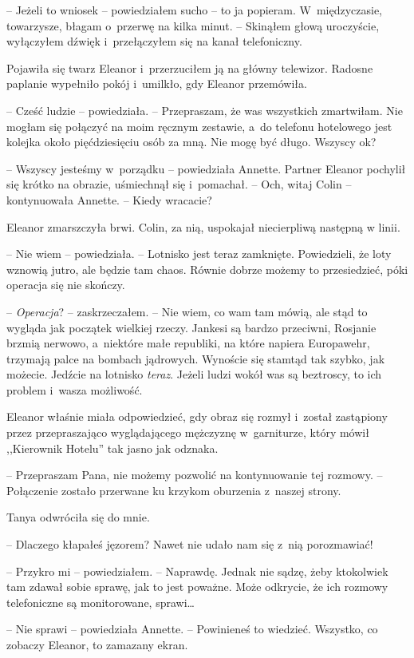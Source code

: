 \documentclass[oneside,polish,11pt,sfheadings]{mwbk}
\begin{document}
-- Jeżeli to wniosek -- powiedziałem sucho -- to ja popieram. W~międzyczasie, towarzysze, błagam o~przerwę na kilka minut. -- Skinąłem
głową uroczyście, wyłączyłem dźwięk i~przełączyłem się na kanał
telefoniczny.

Pojawiła się twarz Eleanor i~przerzuciłem ją na główny telewizor.
Radosne paplanie wypełniło pokój i~umilkło, gdy Eleanor przemówiła.

-- Cześć ludzie -- powiedziała. -- Przepraszam, że was wszystkich
zmartwiłam. Nie mogłam się połączyć na moim ręcznym zestawie, a~do
telefonu hotelowego jest kolejka około pięćdziesięciu osób za mną. Nie
mogę być długo. Wszyscy ok?

-- Wszyscy jesteśmy w~porządku -- powiedziała Annette. Partner Eleanor
pochylił się krótko na obrazie, uśmiechnął się i~pomachał. -- Och, witaj
Colin -- kontynuowała Annette. -- Kiedy wracacie?

Eleanor zmarszczyła brwi. Colin, za nią, uspokajał niecierpliwą następną
w linii. 

-- Nie wiem -- powiedziała. -- Lotnisko jest teraz zamknięte.
Powiedzieli, że loty wznowią jutro, ale będzie tam chaos. Równie dobrze
możemy to przesiedzieć, póki operacja się nie skończy.

-- \emph{Operacja}? -- zaskrzeczałem. -- Nie wiem, co wam tam mówią, ale
stąd to wygląda jak początek wielkiej rzeczy. Jankesi są bardzo
przeciwni, Rosjanie brzmią nerwowo, a~niektóre małe republiki, na które
napiera Europawehr, trzymają palce na bombach jądrowych. Wynoście się
stamtąd tak szybko, jak możecie. Jedźcie na lotnisko \emph{teraz}. Jeżeli
ludzi wokół was są beztroscy, to ich problem i~wasza możliwość.

Eleanor właśnie miała odpowiedzieć, gdy obraz się rozmył i~został
zastąpiony przez przepraszająco wyglądającego mężczyznę w~garniturze,
który mówił ,,Kierownik Hotelu'' tak jasno jak odznaka. 

-- Przepraszam Pana, nie możemy pozwolić na kontynuowanie tej rozmowy. -- Połączenie
zostało przerwane ku krzykom oburzenia z~naszej strony.

Tanya odwróciła się do mnie. 

-- Dlaczego kłapałeś jęzorem? Nawet nie
udało nam się z~nią porozmawiać!

-- Przykro mi -- powiedziałem. -- Naprawdę. Jednak nie sądzę, żeby
ktokolwiek tam zdawał sobie sprawę, jak to jest poważne. Może odkrycie,
że ich rozmowy telefoniczne są monitorowane, sprawi\ldots

-- Nie sprawi -- powiedziała Annette. -- Powinieneś to wiedzieć. Wszystko,
co zobaczy Eleanor, to zamazany ekran.
\end{document}
